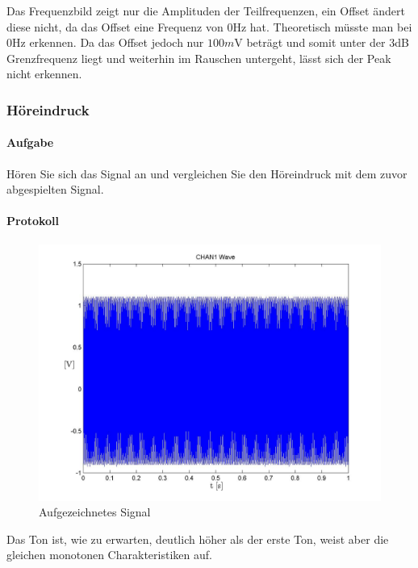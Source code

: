 \documentclass[10pt]{scrreprt}
\begin{document}
        Das Frequenzbild zeigt nur die Amplituden der Teilfrequenzen, ein Offset
        ändert diese nicht, da das Offset eine Frequenz von $0\si{\hertz}$ hat.
        Theoretisch müsste man bei $0 \si{\hertz}$ erkennen. Da das Offset jedoch
        nur $100 \si{m\volt}$ beträgt und somit unter der 3dB Grenzfrequenz liegt
        und weiterhin im Rauschen untergeht, lässt sich der Peak nicht erkennen.

        \subsubsection{Höreindruck}
        \paragraph{Aufgabe}
        Hören Sie sich das Signal an und vergleichen Sie den Höreindruck mit dem zuvor
        abgespielten Signal.
        \paragraph{Protokoll}
        \begin{center}
            \begin{figure}[H]
                \includegraphics[width=\textwidth]{Screenshot_GUI_4132_chan1_wave.jpg}
              \caption{Aufgezeichnetes Signal}
            \end{figure}
        \end{center}

        Das Ton ist, wie zu erwarten, deutlich höher als der erste Ton, weist aber
        die gleichen monotonen Charakteristiken auf.
\end{document}
